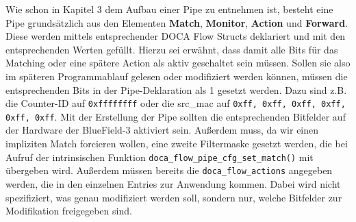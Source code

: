 Wie schon in Kapitel 3 dem Aufbau einer Pipe zu entnehmen ist, besteht eine Pipe grundsätzlich aus den Elementen \textbf{Match}, \textbf{Monitor}, \textbf{Action} und \textbf{Forward}. Diese werden mittels entsprechender DOCA Flow Structs deklariert und mit den entsprechenden Werten gefüllt. Hierzu sei erwähnt, dass damit alle Bits für das Matching oder eine spätere Action als aktiv geschaltet sein müssen. Sollen sie also im späteren Programmablauf gelesen oder modifiziert werden können, müssen die entsprechenden Bits in der Pipe-Deklaration als 1 gesetzt werden. Dazu sind z.B. die Counter-ID auf \texttt{0xffffffff} oder die src\_mac auf \texttt{0xff, 0xff, 0xff, 0xff, 0xff, 0xff}. Mit der Erstellung der Pipe sollten die entsprechenden Bitfelder auf der Hardware der BlueField-3 aktiviert sein. Außerdem muss, da wir einen impliziten Match forcieren wollen, eine zweite Filtermaske gesetzt werden, die bei Aufruf der intrinsischen Funktion \texttt{doca\_flow\_pipe\_cfg\_set\_match()} mit übergeben wird. Außerdem müssen bereits die \texttt{doca\_flow\_actions} angegeben werden, die in den einzelnen Entries zur Anwendung kommen. Dabei wird nicht spezifiziert, was genau modifiziert werden soll, sondern nur, welche Bitfelder zur Modifikation freigegeben sind.

